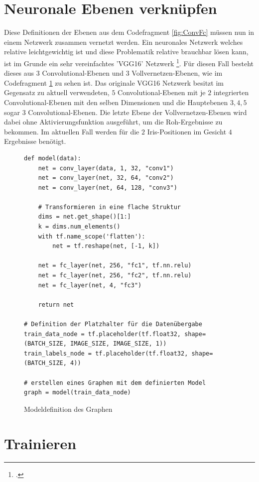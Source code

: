 \section{Neuronale Ebenen verknüpfen}

Diese Definitionen der Ebenen aus dem Codefragment \ref{fig:ConvFc} müssen nun in einem Netzwerk zusammen vernetzt werden. 
Ein neuronales Netzwerk welches relative leichtgewichtig ist und diese Problematik relative brauchbar lösen kann, ist im Grunde ein sehr vereinfachtes 'VGG16' Netzwerk \footcite{VGG16: TODO}.
Für diesen Fall besteht dieses aus $3$ Convolutional-Ebenen und $3$ Vollvernetzen-Ebenen, wie im Codefragment \ref{fig:buildGraph} zu sehen ist. 
Das originale VGG16 Netzwerk besitzt im Gegensatz zu aktuell verwendeten, $5$ Convolutional-Ebenen mit je $2$ integrierten Convolutional-Ebenen mit den selben Dimensionen und die Hauptebenen $3, 4, 5$ sogar $3$ Convolutional-Ebenen. 
Die letzte Ebene der Vollvernetzen-Ebenen wird dabei ohne Aktivierungsfunktion ausgeführt, um die Roh-Ergebnisse zu bekommen. 
Im aktuellen Fall werden für die $2$ Iris-Positionen im Gesicht $4$ Ergebnisse benötigt. 
\begin{figure}[ht!]
\lstset{language=Python}
\begin{lstlisting}
def model(data):
    net = conv_layer(data, 1, 32, "conv1")
    net = conv_layer(net, 32, 64, "conv2")
    net = conv_layer(net, 64, 128, "conv3")

	# Transformieren in eine flache Struktur
    dims = net.get_shape()[1:]
    k = dims.num_elements()
    with tf.name_scope('flatten'):
        net = tf.reshape(net, [-1, k])
    
    net = fc_layer(net, 256, "fc1", tf.nn.relu)    
    net = fc_layer(net, 256, "fc2", tf.nn.relu)
    net = fc_layer(net, 4, "fc3")
    
    return net
    
# Definition der Platzhalter für die Datenübergabe
train_data_node = tf.placeholder(tf.float32, shape=(BATCH_SIZE, IMAGE_SIZE, IMAGE_SIZE, 1))
train_labels_node = tf.placeholder(tf.float32, shape=(BATCH_SIZE, 4))

# erstellen eines Graphen mit dem definierten Model
graph = model(train_data_node)
\end{lstlisting}
	\caption{Modeldefinition des Graphen}
	\label{fig:buildGraph}
\end{figure}

\section{Trainieren}

